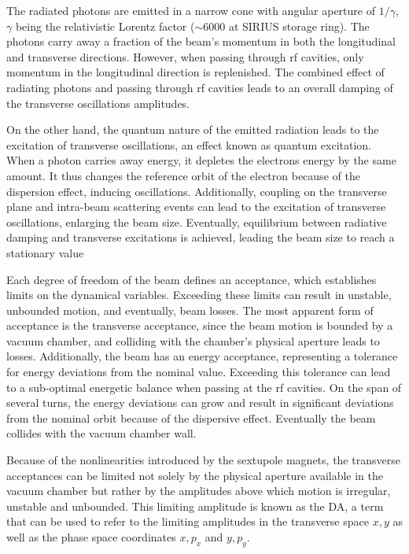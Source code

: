 The radiated photons are emitted in a narrow cone with angular aperture of $1/\gamma$, $\gamma$ being the relativistic Lorentz factor ($\sim 6000$ at SIRIUS storage ring). The photons carry away a fraction of the beam's momentum in both the longitudinal and transverse directions. However, when passing through \gls*{rf} cavities, only momentum in the longitudinal direction is replenished. The combined effect of radiating photons and passing through \gls*{rf} cavities leads to an overall damping of the transverse oscillations amplitudes.

On the other hand, the quantum nature of the emitted radiation leads to the excitation of transverse oscillations, an effect known as quantum excitation. When a photon carries away energy, it depletes the electrons energy by the same amount. It thus changes the reference orbit of the electron because of the dispersion effect, inducing oscillations. Additionally, coupling on the transverse plane and intra-beam scattering events can lead to the excitation of transverse oscillations, enlarging the beam size.
Eventually, equilibrium between radiative damping and transverse excitations is achieved, leading the beam size to reach a stationary value

Each degree of freedom of the beam defines an acceptance, which establishes limits on the dynamical variables. Exceeding these limits can result in unstable, unbounded motion, and eventually, beam losses. The most apparent form of acceptance is the transverse acceptance, since the beam motion is bounded by a vacuum chamber, and colliding with the chamber's physical aperture leads to losses. Additionally, the beam has an energy acceptance, representing a tolerance for energy deviations from the nominal value. Exceeding this tolerance can lead to a sub-optimal energetic balance when passing at the \gls*{rf} cavities. On the span of several turns, the energy deviations can grow and result in significant deviations from the nominal orbit because of the dispersive effect. Eventually the beam collides with the vacuum chamber wall.

Because of the nonlinearities introduced by the sextupole magnets, the transverse acceptances can be limited not solely by the physical aperture available in the vacuum chamber but rather by the amplitudes above which motion is irregular, unstable and unbounded. This limiting amplitude is known as the \gls*{DA}, a term that can be used to refer to the limiting amplitudes in the transverse space $x,y$ as well as the phase space coordinates $x, p_x$ and $y, p_y$.

